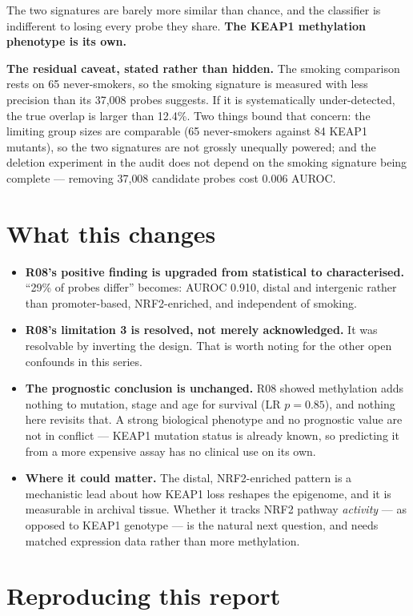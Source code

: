 \documentclass[11pt,a4paper]{article}
\begin{document}
The two signatures are barely more similar than chance, and the classifier is indifferent to
losing every probe they share. \textbf{The KEAP1 methylation phenotype is its own.}

\textbf{The residual caveat, stated rather than hidden.} The smoking comparison rests on 65
never-smokers, so the smoking signature is measured with less precision than its 37{,}008 probes
suggests. If it is systematically under-detected, the true overlap is larger than 12.4\%. Two
things bound that concern: the limiting group sizes are comparable (65 never-smokers against 84
KEAP1 mutants), so the two signatures are not grossly unequally powered; and the deletion
experiment in the audit does not depend on the smoking signature being complete --- removing
37{,}008 candidate probes cost 0.006 AUROC.

\section{What this changes}

\begin{itemize}[leftmargin=1.2em,itemsep=2pt]
\item \textbf{R08's positive finding is upgraded from statistical to characterised.} ``29\% of
probes differ'' becomes: AUROC 0.910, distal and intergenic rather than promoter-based,
NRF2-enriched, and independent of smoking.
\item \textbf{R08's limitation 3 is resolved, not merely acknowledged.} It was resolvable by
inverting the design. That is worth noting for the other open confounds in this series.
\item \textbf{The prognostic conclusion is unchanged.} R08 showed methylation adds nothing to
mutation, stage and age for survival (LR $p = 0.85$), and nothing here revisits that. A strong
biological phenotype and no prognostic value are not in conflict --- KEAP1 mutation status is
already known, so predicting it from a more expensive assay has no clinical use on its own.
\item \textbf{Where it could matter.} The distal, NRF2-enriched pattern is a mechanistic lead
about how KEAP1 loss reshapes the epigenome, and it is measurable in archival tissue. Whether it
tracks NRF2 pathway \emph{activity} --- as opposed to KEAP1 genotype --- is the natural next
question, and needs matched expression data rather than more methylation.
\end{itemize}

\section{Reproducing this report}
\end{document}
